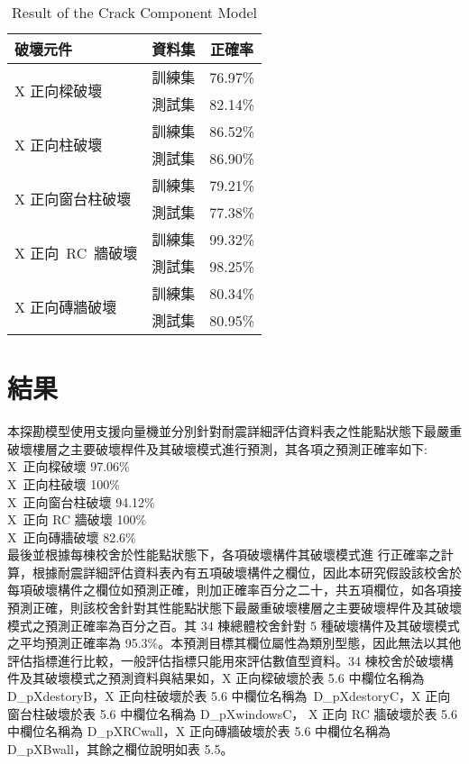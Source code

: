 \setlength{\tabcolsep}{2em}
\begin{table}[hbtp]
  \begin{center}
    \caption{Result of the Crack Component Model}
    \label{tab:comp_result}
    \begin{tabular}{l c c}
    	\hline
    	破壞元件 & 資料集 & 正確率 \\
    	\hline
    	\multirow{2}{*}{X 正向樑破壞} & 訓練集 & 76.97\% \\
    	\cline{2-3} & 測試集 & 82.14\% \\
    	\hline
    	\multirow{2}{*}{X 正向柱破壞} & 訓練集 & 86.52\% \\
    	\cline{2-3} & 測試集 & 86.90\% \\
    	\hline
    	\multirow{2}{*}{X 正向窗台柱破壞} & 訓練集 & 79.21\% \\
    	\cline{2-3} & 測試集 & 77.38\% \\
    	\hline
    	\multirow{2}{*}{X 正向~RC~牆破壞} & 訓練集 & 99.32\% \\
    	\cline{2-3} & 測試集 & 98.25\% \\
    	\hline
    	\multirow{2}{*}{X 正向磚牆破壞} & 訓練集 & 80.34\% \\
    	\cline{2-3} & 測試集 & 80.95\% \\
    	\hline
    \end{tabular}
  \end{center}
\end{table}

\section{結果}

本探勘模型使用支援向量機並分別針對耐震詳細評估資料表之性能點狀態下最嚴重破壞樓層之主要破壞桿件及其破壞模式進行預測，其各項之預測正確率如下: \\ \indent
X~正向樑破壞 97.06\% \\ \indent
X~正向柱破壞 100\% \\ \indent
X~正向窗台柱破壞 94.12\% \\ \indent
X~正向 RC 牆破壞 100\% \\ \indent
X~正向磚牆破壞 82.6\% \\ \indent
最後並根據每棟校舍於性能點狀態下，各項破壞構件其破壞模式進 行正確率之計算，根據耐震詳細評估資料表內有五項破壞構件之欄位，因此本研究假設該校舍於每項破壞構件之欄位如預測正確，則加正確率百分之二十，共五項欄位，如各項接預測正確，則該校舍針對其性能點狀態下最嚴重破壞樓層之主要破壞桿件及其破壞模式之預測正確率為百分之百。其 34 棟總體校舍針對 5 種破壞構件及其破壞模式之平均預測正確率為 95.3\%。本預測目標其欄位屬性為類別型態，因此無法以其他評估指標進行比較，一般評估指標只能用來評估數值型資料。34 棟校舍於破壞構件及其破壞模式之預測資料與結果如，X 正向樑破壞於表 5.6 中欄位名稱為 D\_pXdestoryB，X 正向柱破壞於表 5.6 中欄位名稱為~D\_pXdestoryC，X 正向窗台柱破壞於表 5.6 中欄位名稱為 D\_pXwindowsC， X 正向 RC 牆破壞於表 5.6 中欄位名稱為 D\_pXRCwall，X 正向磚牆破壞於表 5.6 中欄位名稱為 D\_pXBwall，其餘之欄位說明如表 5.5。
